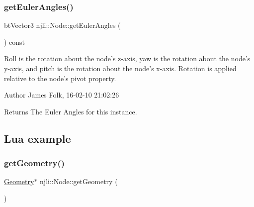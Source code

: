 \mbox{\label{classnjli_1_1_node_a83815891fb443ca57d90572405b2c606}} 
\subsubsection{\texorpdfstring{get\+Euler\+Angles()}{getEulerAngles()}}
{\footnotesize\ttfamily bt\+Vector3 njli\+::\+Node\+::get\+Euler\+Angles (\begin{DoxyParamCaption}{ }\end{DoxyParamCaption}) const}



Roll is the rotation about the node’s z-\/axis, yaw is the rotation about the node’s y-\/axis, and pitch is the rotation about the node’s x-\/axis. Rotation is applied relative to the node’s pivot property. 

\begin{DoxyAuthor}{Author}
James Folk, 16-\/02-\/10 21\+:02\+:26
\end{DoxyAuthor}
\begin{DoxyReturn}{Returns}
The Euler Angles for this instance.
\end{DoxyReturn}
\hypertarget{classnjli_1_1_steering_behavior_wander_ex1}{}\subsection{Lua example}\label{classnjli_1_1_steering_behavior_wander_ex1}

\begin{DoxyCodeInclude}
\end{DoxyCodeInclude}
\mbox{\label{classnjli_1_1_node_af42abaf74067a2bd1c507b8a1fc28796}} 
\subsubsection{\texorpdfstring{get\+Geometry()}{getGeometry()}\hspace{0.1cm}{\footnotesize\ttfamily [1/2]}}
{\footnotesize\ttfamily \mbox{\hyperlink{classnjli_1_1_geometry}{Geometry}}$\ast$ njli\+::\+Node\+::get\+Geometry (\begin{DoxyParamCaption}{ }\end{DoxyParamCaption})}



